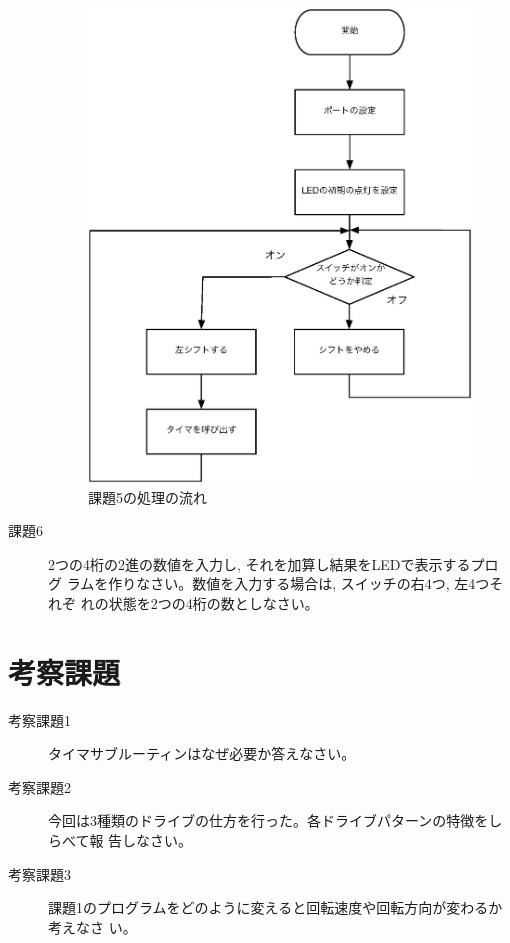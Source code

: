 \begin{description}
\begin{figure}[htbp]
\begin{center}
\includegraphics[width=0.8\linewidth]{img/flow4.eps}
\caption{課題5の処理の流れ}
\label{fig:flow4}
\end{center}
\end{figure}


\item[課題6] 2つの4桁の2進の数値を入力し, それを加算し結果をLEDで表示するプログ
           ラムを作りなさい。数値を入力する場合は, スイッチの右4つ, 左4つそれぞ
           れの状態を2つの4桁の数としなさい。

\end{description}

\newpage

\section{考察課題}

\begin{description}

\item[考察課題1] タイマサブルーティンはなぜ必要か答えなさい。

\item[考察課題2] 今回は3種類のドライブの仕方を行った。各ドライブパターンの特徴をしらべて報
      告しなさい。

\item[考察課題3] 課題1のプログラムをどのように変えると回転速度や回転方向が変わるか考えなさ
      い。
\end{description}